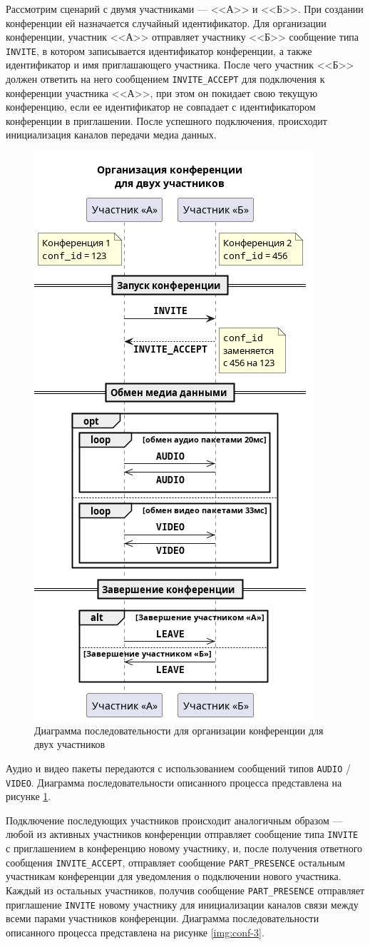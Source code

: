 Рассмотрим сценарий с двумя участниками --- <<А>> и <<Б>>.
При создании конференции ей назначается случайный идентификатор. Для организации конференции, участник <<А>> отправляет участнику <<Б>> сообщение типа \texttt{INVITE}, в котором записывается идентификатор конференции, а также идентификатор и имя приглашающего участника.
После чего участник <<Б>> должен ответить на него сообщением \texttt{INVITE\_ACCEPT} для подключения к конференции участника <<А>>, при этом он покидает свою текущую конференцию, если ее идентификатор не совпадает с идентификатором конференции в приглашении.
После успешного подключения, происходит инициализация каналов передачи медиа данных.

\begin{figure}[H]
  \centering
  \includegraphics[width=0.5\linewidth]{inc/diag/seq-2/conf-2.png}
  \caption{Диаграмма последовательности для организации конференции для двух участников}
  \label{img:conf-2}
\end{figure}

Аудио и видео пакеты передаются с использованием сообщений типов \texttt{AUDIO} / \texttt{VIDEO}.
Диаграмма последовательности описанного процесса представлена на рисунке \ref{img:conf-2}.

Подключение последующих участников происходит аналогичным образом --- любой из активных участников конференции отправляет сообщение типа \texttt{INVITE} с приглашением в конференцию новому участнику, и, после получения ответного сообщения \texttt{INVITE\_ACCEPT}, отправляет сообщение \texttt{PART\_PRESENCE} остальным участникам конференции для уведомления о подключении нового участника.
Каждый из остальных участников, получив сообщение \texttt{PART\_PRESENCE} отправляет приглашение \texttt{INVITE} новому участнику для инициализации каналов связи между всеми парами участников конференции.
Диаграмма последовательности описанного процесса представлена на рисунке \ref{img:conf-3}.

